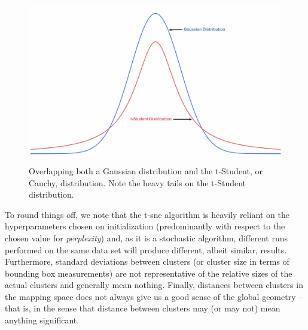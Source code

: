 \begin{figure}[H]
    \centering
    \includegraphics[width=\textwidth]{Images/Chapter 3/t-SNE/t-SNE-Illustration-1.pdf}
    \caption{Overlapping both a Gaussian distribution and the t-Student, or Cauchy, distribution. Note the heavy tails on the t-Student distribution.}
    \label{fig:t-SNE-Illustration}
\end{figure}

\noindent \newline To round things off, we note that the \gls{t-sne} algorithm is heavily reliant on the hyperparameters chosen on initialization (predominantly with respect to the chosen value for \textit{perplexity}) and, as it is a stochastic algorithm, different runs performed on the same data set will produce different, albeit similar, results. Furthermore, standard deviations between clusters (or cluster size in terms of bounding box measurements) are not representative of the relative sizes of the actual clusters and generally mean nothing. Finally, distances between clusters in the mapping space does not always give us a good sense of the global geometry -- that is, in the sense that distance between clusters may (or may not) mean anything significant.

